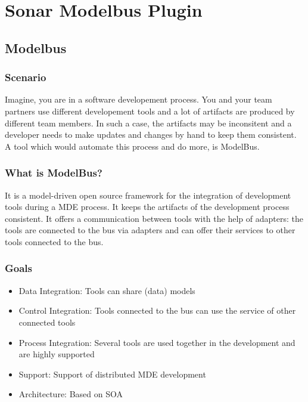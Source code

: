 \chapter{Sonar Modelbus Plugin} \label{sec:sonar_modelbus_plungin}

\section{Modelbus} \label{sec:modelbus}
\subsection{Scenario}

Imagine, you are in a software developement process. You and your team partners use different developement tools and a lot of artifacts are produced by different team members. In such a case, the artifacts may be inconsitent and a developer needs to make updates and changes by hand to keep them consistent. A tool which would automate this process and do more, is ModelBus.

\subsection{What is ModelBus?}

It is a model-driven open source framework for the integration of development tools during a MDE process. It keeps the artifacts of the development process consistent. It offers a communication between tools with the help of adapters: the tools are connected to the bus via adapters and can offer their services to other tools connected to the bus.

\subsection{Goals}
\begin{itemize}
\item Data Integration: Tools can share (data) models
\item Control Integration: Tools connected to the bus can use the service of other connected tools
\item Process Integration: Several tools are used together in the development and are highly supported
\item Support: Support of distributed MDE development
\item Architecture: Based on SOA
\end{itemize}

